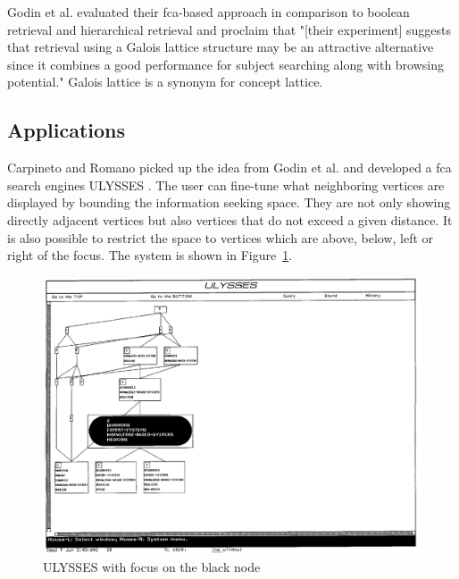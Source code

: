 \documentclass[11pt]{report}
\begin{document}
Godin et al. \cite{Godin1993} evaluated their \acrshort{fca}-based approach in comparison to boolean retrieval and hierarchical retrieval and proclaim that "[their experiment] suggests that retrieval using a Galois lattice structure may be an attractive alternative since it combines a good performance for subject searching along with browsing potential." Galois lattice is a synonym for concept lattice.
\subsection{Applications}

Carpineto and Romano picked up the idea from Godin et al. and developed a \acrshort{fca} search engines ULYSSES \cite{Carpineto1995,Carpineto1996}. The user can fine-tune what neighboring vertices are displayed by bounding the information seeking space. They are not only showing directly adjacent vertices but also vertices that do not exceed a given distance. It is also possible to restrict the space to vertices which are above, below, left or right of the focus. The system is shown in Figure~\ref{figure:ulysses}. \\

\begin{figure}[!ht]
	\centering
	\includegraphics[width=\linewidth]{images/ulysses}
\caption{ULYSSES with focus on the black node \cite{Carpineto1996} }
\label{figure:ulysses}
\end{figure}
\end{document}
